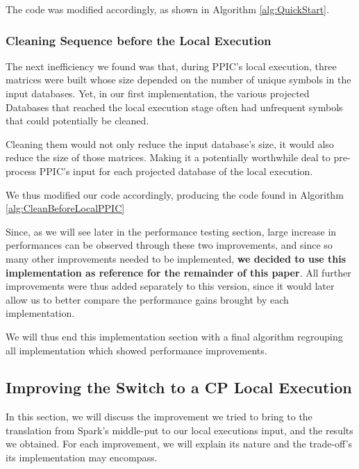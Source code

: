 \documentclass{eplmastersthesis}
\begin{document}
The code was modified accordingly, as shown in Algorithm \ref{alg:QuickStart}.

\subsubsection{Cleaning Sequence before the Local Execution}

The next inefficiency we found was that, during PPIC's local execution, three matrices were built whose size depended on the number of  unique symbols in the input databases.
Yet, in our first implementation, the various projected Databases that reached the local execution stage often had unfrequent symbols that could potentially be cleaned. \newline

Cleaning them would not only reduce the input database's size, it would also reduce the size of those matrices. Making it a potentially worthwhile deal to pre-process PPIC's input for each projected database of the local execution. \newline

We thus modified our code accordingly, producing the code found in Algorithm \ref{alg:CleanBeforeLocalPPIC} \newline

Since, as we will see later in the performance testing section, large increase in performances can be observed through these two improvements, and since so many other improvements needed to be implemented, \textbf{we decided to use this implementation as reference for the remainder of this paper}. All further improvements were thus added separately to this version, since it would later allow us to better compare the performance gains brought by each implementation. \newline

We will thus end this implementation section with a final algorithm regrouping all implementation which showed performance improvements.

\subsection{Improving the Switch to a CP Local Execution}

In this section, we will discuss the improvement we tried to bring to the translation from Spark's middle-put to our local executions input, and the results we obtained. For each improvement, we will explain its nature and the trade-off's its implementation may encompass.
\end{document}
